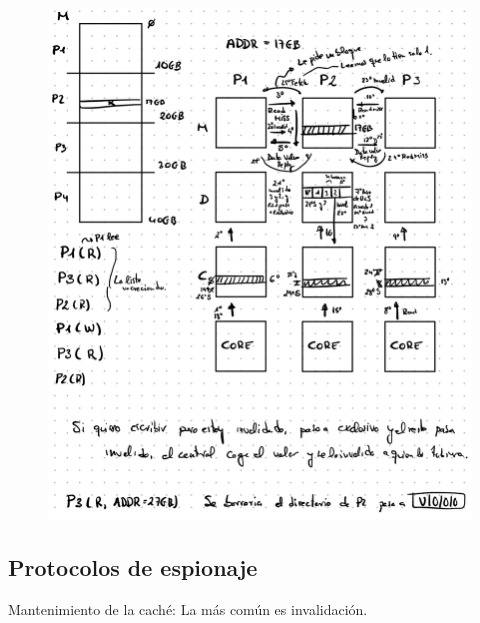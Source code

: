 \documentclass[12pt, twoside, openright]{report} %
\begin{document}
\begin{figure}[H]
	{\includegraphics[scale=.3]{Untitled 48.png}}
\end{figure}
\pagebreak
\subsection{Protocolos de espionaje}



    Mantenimiento de la caché: La más común es invalidación.
\end{document}
